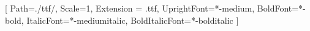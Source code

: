 

\usepackage[american]{babel}


\renewcommand{\baselinestretch}{2}


\setmainfont{poppins}[ %
  Path=./ttf/,
  Scale=1,
  Extension = .ttf,
  UprightFont=*-medium,
  BoldFont=*-bold,
  ItalicFont=*-mediumitalic,
  BoldItalicFont=*-bolditalic
]


\renewcommand\footnoterule{}
